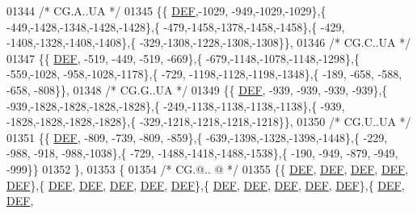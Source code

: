 \begin{DoxyCode}
01344 \textcolor{comment}{/* CG.A..UA */}
01345 \{\{  \mbox{\hyperlink{1_88_84__epars_8h_a397419fc12b37ed479c8abb9d444d843}{DEF}},-1029, -949,-1029,-1029\},\{ -449,-1428,-1348,-1428,-1428\},\{ -479,-1458,-1378,-1458,-1458\},\{ -429,
      -1408,-1328,-1408,-1408\},\{ -329,-1308,-1228,-1308,-1308\}\},
01346 \textcolor{comment}{/* CG.C..UA */}
01347 \{\{  \mbox{\hyperlink{1_88_84__epars_8h_a397419fc12b37ed479c8abb9d444d843}{DEF}}, -519, -449, -519, -669\},\{ -679,-1148,-1078,-1148,-1298\},\{ -559,-1028, -958,-1028,-1178\},\{ -729,
      -1198,-1128,-1198,-1348\},\{ -189, -658, -588, -658, -808\}\},
01348 \textcolor{comment}{/* CG.G..UA */}
01349 \{\{  \mbox{\hyperlink{1_88_84__epars_8h_a397419fc12b37ed479c8abb9d444d843}{DEF}}, -939, -939, -939, -939\},\{ -939,-1828,-1828,-1828,-1828\},\{ -249,-1138,-1138,-1138,-1138\},\{ -939,
      -1828,-1828,-1828,-1828\},\{ -329,-1218,-1218,-1218,-1218\}\},
01350 \textcolor{comment}{/* CG.U..UA */}
01351 \{\{  \mbox{\hyperlink{1_88_84__epars_8h_a397419fc12b37ed479c8abb9d444d843}{DEF}}, -809, -739, -809, -859\},\{ -639,-1398,-1328,-1398,-1448\},\{ -229, -988, -918, -988,-1038\},\{ -729,
      -1488,-1418,-1488,-1538\},\{ -190, -949, -879, -949, -999\}\}
01352 \},
01353 \{
01354 \textcolor{comment}{/* CG.@.. @ */}
01355 \{\{  \mbox{\hyperlink{1_88_84__epars_8h_a397419fc12b37ed479c8abb9d444d843}{DEF}},  \mbox{\hyperlink{1_88_84__epars_8h_a397419fc12b37ed479c8abb9d444d843}{DEF}},  \mbox{\hyperlink{1_88_84__epars_8h_a397419fc12b37ed479c8abb9d444d843}{DEF}},  \mbox{\hyperlink{1_88_84__epars_8h_a397419fc12b37ed479c8abb9d444d843}{DEF}},  \mbox{\hyperlink{1_88_84__epars_8h_a397419fc12b37ed479c8abb9d444d843}{DEF}}\},\{  \mbox{\hyperlink{1_88_84__epars_8h_a397419fc12b37ed479c8abb9d444d843}{DEF}},  \mbox{\hyperlink{1_88_84__epars_8h_a397419fc12b37ed479c8abb9d444d843}{DEF}},  \mbox{\hyperlink{1_88_84__epars_8h_a397419fc12b37ed479c8abb9d444d843}{DEF}},  
      \mbox{\hyperlink{1_88_84__epars_8h_a397419fc12b37ed479c8abb9d444d843}{DEF}},  \mbox{\hyperlink{1_88_84__epars_8h_a397419fc12b37ed479c8abb9d444d843}{DEF}}\},\{  \mbox{\hyperlink{1_88_84__epars_8h_a397419fc12b37ed479c8abb9d444d843}{DEF}},  \mbox{\hyperlink{1_88_84__epars_8h_a397419fc12b37ed479c8abb9d444d843}{DEF}},  \mbox{\hyperlink{1_88_84__epars_8h_a397419fc12b37ed479c8abb9d444d843}{DEF}},  \mbox{\hyperlink{1_88_84__epars_8h_a397419fc12b37ed479c8abb9d444d843}{DEF}},  \mbox{\hyperlink{1_88_84__epars_8h_a397419fc12b37ed479c8abb9d444d843}{DEF}}\},\{  \mbox{\hyperlink{1_88_84__epars_8h_a397419fc12b37ed479c8abb9d444d843}{DEF}},  \mbox{\hyperlink{1_88_84__epars_8h_a397419fc12b37ed479c8abb9d444d843}{DEF}},  

\end{DoxyCode}
